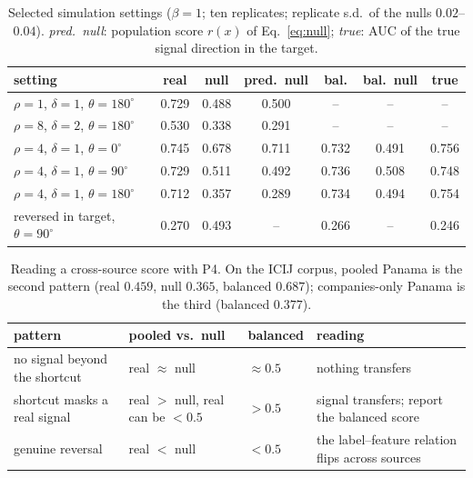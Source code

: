 \documentclass[11pt]{article}
\begin{document}
\begin{table}[t]\centering\small\setlength{\tabcolsep}{4pt}
\begin{tabular}{lcccccc}
\toprule
setting & real & null & pred.\ null & bal. & bal.\ null & true\\
\midrule
$\rho=1$, $\delta=1$, $\theta=180^\circ$ & 0.729 & 0.488 & 0.500 & -- & -- & --\\
$\rho=8$, $\delta=2$, $\theta=180^\circ$ & 0.530 & 0.338 & 0.291 & -- & -- & --\\
$\rho=4$, $\delta=1$, $\theta=0^\circ$ & 0.745 & 0.678 & 0.711 & 0.732 & 0.491 & 0.756\\
$\rho=4$, $\delta=1$, $\theta=90^\circ$ & 0.729 & 0.511 & 0.492 & 0.736 & 0.508 & 0.748\\
$\rho=4$, $\delta=1$, $\theta=180^\circ$ & 0.712 & 0.357 & 0.289 & 0.734 & 0.494 & 0.754\\
reversed in target, $\theta=90^\circ$ & 0.270 & 0.493 & -- & 0.266 & -- & 0.246\\
\bottomrule
\end{tabular}
\caption{Selected simulation settings ($\beta=1$; ten replicates; replicate s.d.\ of
the nulls $0.02$--$0.04$). \emph{pred.\ null}: population score $r(x)$ of
Eq.~\eqref{eq:null}; \emph{true}: AUC of the true signal direction in the target.}
\label{tab:sim}\end{table}

\begin{table}[t]\centering\small\setlength{\tabcolsep}{4pt}
\begin{tabular}{p{3.6cm}p{2.3cm}p{2.3cm}p{4.2cm}}
\toprule
pattern & pooled vs.\ null & balanced & reading\\
\midrule
no signal beyond the shortcut & real $\approx$ null & $\approx0.5$ & nothing transfers\\
shortcut masks a real signal & real $>$ null, real can be $<0.5$ & $>0.5$ & signal transfers; report the balanced score\\
genuine reversal & real $<$ null & $<0.5$ & the label--feature relation flips across sources\\
\bottomrule
\end{tabular}
\caption{Reading a cross-source score with P4. On the ICIJ corpus, pooled Panama is
the second pattern (real $0.459$, null $0.365$, balanced $0.687$); companies-only
Panama is the third (balanced $0.377$).}\label{tab:diag}\end{table}
\end{document}
